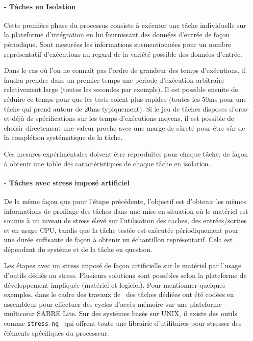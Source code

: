 \documentclass[french, a4paper, 11pt, twoside, pdftex]{StyleThese}
\begin{document}
		\paragraph{ - Tâches en Isolation}
			
			Cette première phase du processus consiste à exécuter une tâche individuelle sur la plateforme d'intégration en lui fournissant des données d'entrée de façon périodique. Sont mesurées les informations susmentionnées pour un nombre représentatif d'exécutions au regard de la variété possible des données d'entrée. 
			
			Dans le cas où l'on ne connaît pas l'ordre de grandeur des temps d'exécutions, il faudra prendre dans un premier temps une période d'exécution arbitraire relativement large (toutes les secondes par exemple). Il est possible ensuite de réduire ce temps pour que les tests soient plus rapides (toutes les 50ms pour une tâche qui prend autour de 20ms typiquement). Si le jeu de tâches disposes d'ores-et-déjà de spécifications sur les temps d'exécutions moyens, il est possible de choisir directement une valeur proche avec une marge de sûreté pour être sûr de la complétion systématique de la tâche.
			
			Ces mesures expérimentales doivent être reproduites pour chaque tâche, de façon à obtenir une table des caractéristiques de chaque tâche en isolation.
                    
    	\paragraph{ - Tâches avec stress imposé artificiel}
    		
    		De la même façon que pour l'étape précédente, l'objectif est d'obtenir les mêmes informations de profilage des tâches dans une mise en situation où le matériel est soumis à un niveau de stress élevé sur l'utilisation des caches, des entrées/sorties et en usage CPU, tandis que la tâche testée est exécutée périodiquement pour une durée suffisante de façon à obtenir un échantillon représentatif. Cela est dépendant du système et de la tâche en question.
    		
    		Les étapes avec un stress imposé de façon artificielle sur le matériel par l'usage d'outils dédiés au stress. Plusieurs solutions sont possibles selon la plateforme de développement impliquée (matériel et logiciel). Pour mentionner quelques exemples, dans le cadre des travaux de~\cite{blin_maximizing_2016} des tâches dédiées ont été codées en assembleur pour effectuer des cycles d'accès mémoire sur une plateforme multicœur SABRE Lite. Sur des systèmes basés sur UNIX, il existe des outils comme \texttt{stress-ng}~\cite{king_stress-ng_2019} qui offrent toute une librairie d'utilitaires pour stresser des éléments spécifiques du processeur. 
    		
\end{document}
